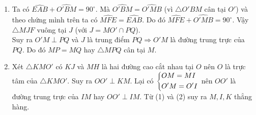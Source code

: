 \begin{bt}
{\begin{enumerate}
			Lại có $\widehat{OMF}=\widehat{EAB}$ (cùng phụ với góc $\widehat{HMA}$), suy ra $\widehat{MFE}=\widehat{EAB}$. \\
			Mà $\widehat{MFE}+\widehat{EFB}=180^\circ$, suy ra $\widehat{EAB}+\widehat{EFB}=180^\circ$. \\
			Vậy $AEFB$ là tứ giác nội tiếp.
			\item Ta có $\widehat{EAB}+\widehat{O'BM}=90^\circ$.
			Mà $\widehat{O'BM}=\widehat{O'MB}$ (vì $\triangle O'BM$ cân tại $O'$) và theo chứng mình trên ta có $\widehat{MFE}=\widehat{EAB}$.
			Do đó $\widehat{MFE}+\widehat{O'MB}=90^\circ$. Vậy $\triangle MJF$ vuông tại $J$ (với $J=MO'\cap PQ$).\\
			Suy ra $O'M\perp PQ$ và $J$ là trung điểm $PQ \Rightarrow O'M$ là đường trung trực của $PQ$.
			Do đó $MP=MQ$ hay $\triangle MPQ$ cân tại $M$.
			\item Xét $\triangle KMO'$ có $KJ$ và $MH$ là hai đường cao cắt nhau tại $O$ nên $O$ là trực tâm của $\triangle KMO'$. Suy ra $OO'\perp KM$. 
			Lại có $\left\{\begin{aligned}& OM = MI \\ & O'M = O'I\end{aligned}\right.$ nên $OO'$ là đường trung trực của $IM$ hay $OO'\perp IM$. 
			Từ (1) và (2) suy ra $M,I,K$ thẳng hàng.
		\end{enumerate}
	}
\end{bt}

